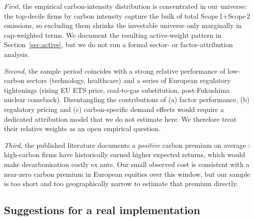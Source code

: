 \documentclass[11pt,a4paper]{article}
\begin{document}
\emph{First}, the empirical carbon-intensity distribution is concentrated
in our universe: the top-decile firms by carbon intensity capture the
bulk of total Scope\,1$+$Scope\,2 emissions, so excluding them shrinks
the investable universe only marginally in cap-weighted terms. We
document the resulting active-weight pattern in
Section~\ref{sec:active}, but we do not run a formal sector- or
factor-attribution analysis.

\emph{Second}, the sample period coincides with a strong relative
performance of low-carbon sectors (technology, healthcare) and a series
of European regulatory tightenings (rising EU ETS price, coal-to-gas
substitution, post-Fukushima nuclear comeback). Disentangling the
contributions of (a) factor performance, (b) regulatory pricing and
(c) carbon-specific demand effects would require a dedicated
attribution model that we do not estimate here. We therefore treat
their relative weights as an open empirical question.

\emph{Third}, the published literature documents a \emph{positive}
carbon premium on average \citep{BoltonKacperczyk2021}: high-carbon
firms have historically earned higher expected returns, which would
make decarbonisation costly ex ante. Our small observed cost is
consistent with a near-zero carbon premium in European equities over
this window, but our sample is too short and too geographically narrow
to estimate that premium directly.

\subsection{Suggestions for a real implementation}
\end{document}
